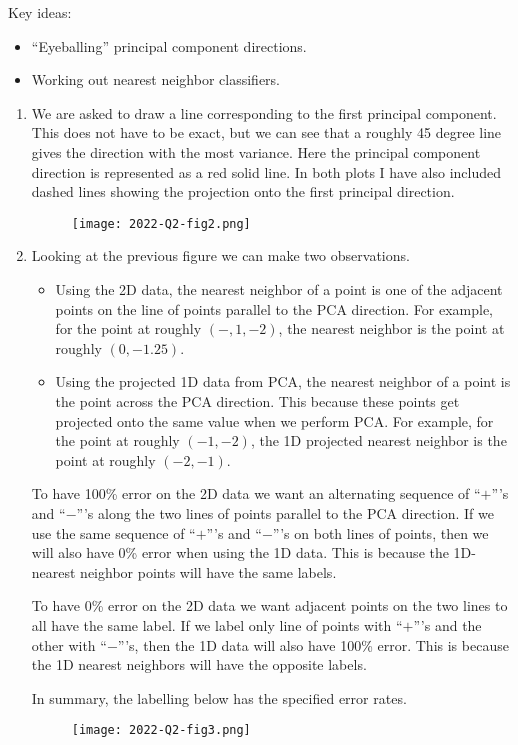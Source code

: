 Key ideas:
\begin{itemize}
    \item ``Eyeballing'' principal component directions.
    \item Working out nearest neighbor classifiers.
\end{itemize}
\begin{enumerate}
    \item We are asked to draw a line corresponding to the first principal component. This does not have to be exact, but we can see that a roughly 45 degree line gives the direction with the most variance. Here the principal component direction is represented as a red solid line. In both plots I have also included dashed lines showing the projection onto the first principal direction.
    \begin{figure}[h]
        \begin{center}
            \texttt{[image: 2022-Q2-fig2.png]}
        \end{center}
    \end{figure}
    \item Looking at the previous figure we can make two observations. 
    \begin{itemize}
        \item Using the 2D data, the nearest neighbor of a point is one of the adjacent points on the line of points parallel to the PCA direction. For example, for the point at roughly $(-,1,-2)$, the nearest neighbor is the point at roughly $(0,-1.25)$.
        \item Using the projected 1D data from PCA, the nearest neighbor of a point is the point across the PCA direction. This because these points get projected onto the same value when we perform PCA. For example, for the point at roughly $(-1,-2)$, the 1D projected nearest neighbor is the point at roughly $(-2,-1)$.
    \end{itemize}
    To have 100\% error on the 2D data we want an alternating sequence of ``$+$'''s and ``$-$'''s along the two lines of points parallel to the PCA direction. If we use the same sequence of ``$+$'''s and ``$-$'''s on both lines of points, then we will also have 0\% error when using the 1D data. This is because the 1D-nearest neighbor points will have the same labels. 

    To have 0\% error on the 2D data we want adjacent points on the two lines to all have the same label. If we label only line of points with ``$+$'''s and the other with ``$-$'''s, then the 1D data will also have 100\% error. This is because the 1D nearest neighbors will have the opposite labels. 
    
    In summary, the labelling below has the specified error rates.
    \begin{figure}
        [h]
        \begin{center}
            \texttt{[image: 2022-Q2-fig3.png]}
        \end{center}
    \end{figure}
\end{enumerate}